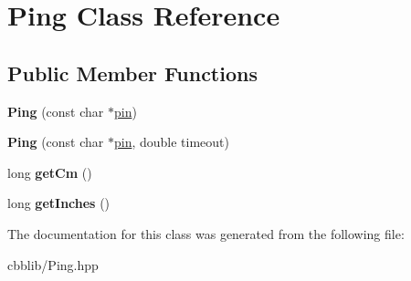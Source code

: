 \hypertarget{classPing}{\section{\-Ping \-Class \-Reference}
\label{classPing}
}
\subsection*{\-Public \-Member \-Functions}
\begin{DoxyCompactItemize}
\item 
\hypertarget{classPing_a786a4db8cc924b24d7f573a1c7057e43}{{\bfseries \-Ping} (const char $\ast$\hyperlink{structpin}{pin})}\label{classPing_a786a4db8cc924b24d7f573a1c7057e43}

\item 
\hypertarget{classPing_a8478ec9221b61664c4f8aac0f10ad9c1}{{\bfseries \-Ping} (const char $\ast$\hyperlink{structpin}{pin}, double timeout)}\label{classPing_a8478ec9221b61664c4f8aac0f10ad9c1}

\item 
\hypertarget{classPing_ac9c939f843c0fedead6600533b8be811}{long {\bfseries get\-Cm} ()}\label{classPing_ac9c939f843c0fedead6600533b8be811}

\item 
\hypertarget{classPing_a683f58ccb6bd5ef4c8ee82f2cf0a1652}{long {\bfseries get\-Inches} ()}\label{classPing_a683f58ccb6bd5ef4c8ee82f2cf0a1652}

\end{DoxyCompactItemize}


\-The documentation for this class was generated from the following file\-:\begin{DoxyCompactItemize}
\item 
cbblib/\-Ping.\-hpp\end{DoxyCompactItemize}
